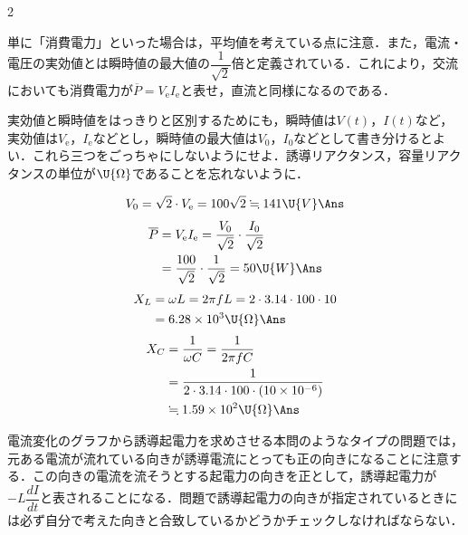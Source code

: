 \setlength{\columnseprule}{0.4pt}
\begin{multicols}{2}
\raggedcolumns

\par\nopagebreak
\begin{sisin}
単に「消費電力」といった場合は，平均値を考えている点に注意．また，電流・電圧の実効値とは瞬時値の最大値の$\dfrac{1}{\sqrt{2}}$倍と定義されている．これにより，交流においても消費電力が$\overline{P}=V_{\mathrm{e}}I_{\mathrm{e}}$と表せ，直流と同様になるのである．

実効値と瞬時値をはっきりと区別するためにも，瞬時値は$V(t)$，$I(t)$など，実効値は$V_{\mathrm{e}}$，$I_{\mathrm{e}}$などとし，瞬時値の最大値は$V_0$，$I_0$などとして書き分けるとよい．これら三つをごっちゃにしないようにせよ．誘導リアクタンス，容量リアクタンスの単位が$\U{\Omega}$であることを忘れないように．
\end{sisin}
\KaiHead
\begin{komon}
 \[V_0=\sqrt{2}\cdot V_{\mathrm{e}}=100\sqrt{2}\fallingdotseq 141\U{V}\Ans\]
 \[\begin{aligned}\overline{P}&=V_{\mathrm{e}}I_{\mathrm{e}}=\frac{V_0}{\sqrt{2}}\cdot\frac{I_0}{\sqrt{2}}\\&=\frac{100}{\sqrt{2}}\cdot\frac{1}{\sqrt{2}}=50\U{W}\Ans\end{aligned}\]
 \[\begin{aligned}X_L&=\omega L=2\pi fL=2\cdot 3.14\cdot 100\cdot 10\\&=6.28\times 10^3\U{\Omega}\Ans\end{aligned}\]
       \[\begin{aligned}X_C&=\frac{1}{\omega C}=\frac{1}{2\pi fC}\\&=\frac{1}{2\cdot 3.14\cdot 100\cdot(10\times 10^{-6})}\\&\fallingdotseq 1.59\times 10^2\U{\Omega}\Ans\end{aligned}\]
\end{komon}

\par\nopagebreak
\begin{sisin}
電流変化のグラフから誘導起電力を求めさせる本問のようなタイプの問題では，元ある電流が流れている向きが誘導電流にとっても正の向きになることに注意する．この向きの電流を流そうとする起電力の向きを正として，誘導起電力が$-L\dfrac{dI}{dt}$と表されることになる．問題で誘導起電力の向きが指定されているときには必ず自分で考えた向きと合致しているかどうかチェックしなければならない．


\end{sisin}
\end{multicols}
